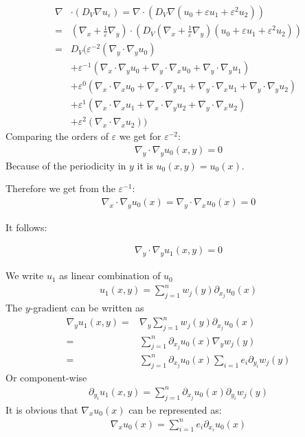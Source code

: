 \documentclass[10pt, a4paper]{article}
\begin{document}
 \begin{align*}
 \nabla &\cdot (D_V \nabla u_\varepsilon) = \nabla \cdot (D_V\nabla(u_0 + \varepsilon u_1 + \varepsilon^2 u_2)) \\
        =& (\nabla_x + \frac{1}{\varepsilon} \nabla_y) \cdot (D_V (\nabla_x + \frac{1}{\varepsilon} \nabla_y)(u_0 + \varepsilon u_1 + \varepsilon^2 u_2))\\
        =& D_V ( \varepsilon^{-2}( \nabla_y \cdot \nabla_y u_0) \\
        &+ \varepsilon^{-1}(\nabla_x \cdot \nabla_y u_0 + \nabla_y \cdot \nabla_x u_0 + \nabla_y \cdot \nabla_y u_1) \\
        &+ \varepsilon^0(\nabla_x \cdot \nabla_x u_0 + \nabla_x \cdot \nabla_y u_1 + \nabla_y \cdot \nabla_x u_1 + \nabla_y \cdot \nabla_y u_2 )\\ 
        &+ \varepsilon^1( \nabla_x \cdot \nabla_x u_1 + \nabla_x \cdot \nabla_y u_2 + \nabla_y \cdot \nabla_x u_2)\\
        &+ \varepsilon^2(\nabla_x \cdot \nabla_x u_2))
 \end{align*}
 Comparing the orders of $\varepsilon$ we get for $\varepsilon^{-2}$:
 \begin{align}
 \nabla_y \cdot \nabla_y u_0(x,y) = 0
 \end{align}
 Because of the periodicity in $y$ it is $u_0(x,y) = u_0(x)$.
 
 Therefore we get from the $\varepsilon^{-1}$:
 \begin{align}
 \nabla_x \cdot \nabla_y u_0(x) = \nabla_y \cdot \nabla_x u_0(x) = 0 
 \end{align}
 
 It follows:
 
 \begin{align}
 \nabla_y \cdot \nabla_y u_1(x,y) = 0
 \end{align}
 
 We write $u_1$ as linear combination of $u_0$
 \begin{align}
 \label{lin_combi_u_1}
 u_1(x,y) = \sum_{j=1}^n w_j(y) \partial_{x_j}u_0(x)
 \end{align}
 The $y$-gradient can be written as
 \begin{align}
 \label{gradienty u1}
 \nabla_y u_1(x,y) = & \nabla_y \sum_{j=1}^n w_j(y) \partial_{x_j}u_0(x)\\
                   = & \sum_{j=1}^n \partial_{x_j} u_0(x) \nabla_y w_j(y) \\
                   = & \sum_{j=1}^n \partial_{x_j} u_0(x) \sum_{i=1} e_i \partial_{y_i} w_j(y)
 \end{align}
 Or component-wise
 \begin{align*}
 \partial_{y_i} u_1(x,y) = \sum_{j=1}^n \partial_{x_j} u_0(x) \partial_{y_i}w_j(y)
 \end{align*}
It is obvious that $\nabla_x u_0(x)$ can be represented as:
  \begin{align}
 \nabla_x u_0(x) = \sum_{i=1}^n e_i \partial_{x_i}u_0(x)
 \end{align}
 
\end{document}
